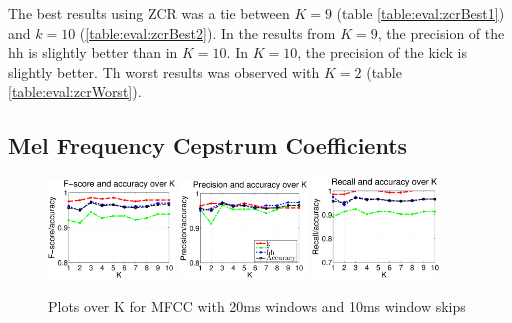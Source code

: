 		The best results using ZCR was a tie between $K=9$ (table \ref{table:eval:zcrBest1}) and $k=10$ (\ref{table:eval:zcrBest2}). In the results from $K=9$, the precision of the hh is slightly better than in $K=10$. In $K=10$, the precision of the kick is slightly better.
		Th worst results was observed with $K=2$ (table \ref{table:eval:zcrWorst}).

		
	\subsection{Mel Frequency Cepstrum Coefficients}
		\begin{figure}
			\centering\includegraphics[width=0.3\textwidth]{tex/appendices/test/mfcc2010FP.png}
			\centering\includegraphics[width=0.3\textwidth]{tex/appendices/test/mfcc2010_P.png}
			\centering\includegraphics[width=0.3\textwidth]{tex/appendices/test/mfcc2010_R.png}
			
			\caption{Plots over K for MFCC with 20ms windows and 10ms window skips}
		\end{figure}
